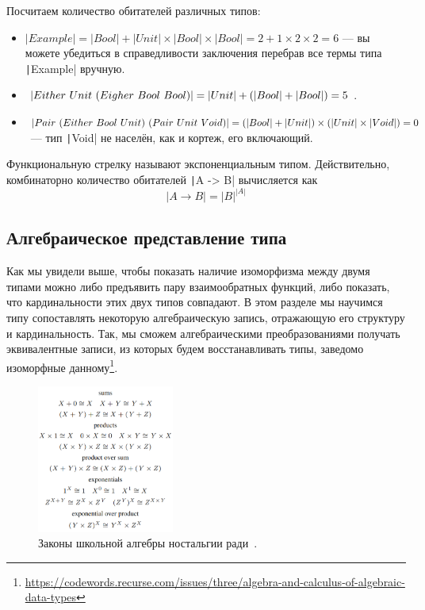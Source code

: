 Посчитаем количество обитателей различных типов:
\begin{itemize}
    \item $|Example| = |Bool| + |Unit| \times |Bool| \times |Bool| = 2 + 1 \times 2 \times 2 = 6$ --- вы можете убедиться в справедливости заключения перебрав все термы типа \texttt|Example| вручную.
    \item $|Either ~ Unit~ (Eigher ~ Bool~ Bool)| = |Unit| + (|Bool| + |Bool|) = 5$.
    \item $|Pair~ (Either~ Bool~ Unit)~ (Pair~ Unit~ Void)| = (|Bool| + |Unit|) \times (|Unit| \times |Void|) = 0$ ~--- тип \texttt|Void| не населён, как и кортеж, его включающий.
\end{itemize}

Функциональную стрелку называют экспоненциальным типом.
Действительно, комбинаторно количество обитателей \texttt|A -> B| вычисляется как \[|A \to B| = |B|^{|A|}\]

\subsection{Алгебраическое представление типа} \label{subsec:type-algebra}

Как мы увидели выше, чтобы показать наличие изоморфизма между двумя типами можно либо предъявить пару взаимообратных функций, либо показать, что кардинальности этих двух типов совпадают.
В этом разделе мы научимся типу сопоставлять некоторую алгебраическую запись, отражающую его структуру и кардинальность.
Так, мы сможем алгебраическими преобразованиями получать эквивалентные записи, из которых будем восстанавливать типы, заведомо изоморфные данному\footnote{\url{https://codewords.recurse.com/issues/three/algebra-and-calculus-of-algebraic-data-types}}.















\begin{figure}[h]
    \centering
    \includegraphics[width=0.4\textwidth]{figs/school-alg}
    \caption{Законы школьной алгебры ностальгии ради~\cite{hinze2010reason}.}
    \label{fig:school-alg}
\end{figure}

